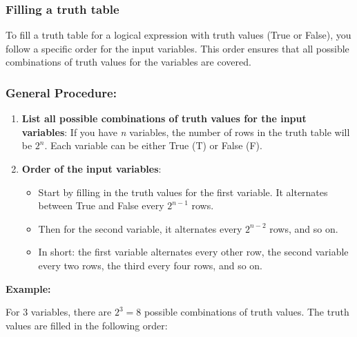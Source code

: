 \subsubsection{Filling a truth table}
To fill a truth table for a logical expression with truth values (True or False), you follow a 
specific order for the input variables. This order ensures that all possible combinations of truth values 
for the variables are covered.

\subsubsection{General Procedure:}

\begin{enumerate}

	\item \textbf{List all possible combinations of truth values for the input variables}: 
			If you have \emph{n} variables, the number of rows in the truth table will be \(2^n\). Each 
			variable can be either True (T) or False (F).

	\item \textbf{Order of the input variables}:

			\begin{itemize}
					
				\item Start by filling in the truth values for the first variable. It alternates between 
					  True and False every \(2^{n-1}\) rows.
					
				\item Then for the second variable, it alternates every \(2^{n-2}\) rows, and so on.
					
				\item In short: the first variable alternates every other row, the second variable every two 
					rows, the third every four rows, and so on.
			
			\end{itemize}

\end{enumerate}

\textbf{Example: } 
\vspace{\baselineskip}

For 3 variables, there are \(2^3 = 8\) possible combinations of truth values. The truth values are filled 
in the following order:

